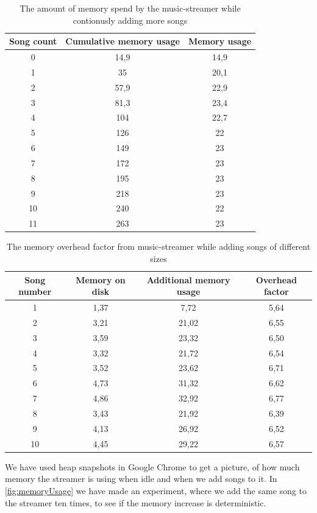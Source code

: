 \begin{table}[]
\centering
\begin{tabular}{|c|c|c|} \hline
Song count & Cumulative memory usage & Memory usage \\ \hline
0  & 14,9 & 14,9 \\
1  & 35   & 20,1 \\
2  & 57,9 & 22,9 \\
3  & 81,3 & 23,4 \\
4  & 104  & 22,7 \\
5  & 126  & 22   \\
6  & 149  & 23   \\
7  & 172  & 23   \\
8  & 195  & 23   \\
9  & 218  & 23   \\
10 & 240  & 22   \\
11 & 263  & 23   \\ \hline
\end{tabular}
\caption{The amount of memory spend by the music-streamer while contionusly adding more songs}
\label{tab_memUsage}
\end{table}

\begin{table}[]
\centering
\begin{tabular}{|c|c|c|c|} \hline
Song number & Memory on disk & Additional memory usage & Overhead factor \\ \hline
1  & 1,37 & 7,72  & 5,64 \\
2  & 3,21 & 21,02 & 6,55 \\
3  & 3,59 & 23,32 & 6,50 \\
4  & 3,32 & 21,72 & 6,54 \\
5  & 3,52 & 23,62 & 6,71 \\
6  & 4,73 & 31,32 & 6,62 \\
7  & 4,86 & 32,92 & 6,77 \\
8  & 3,43 & 21,92 & 6,39 \\
9  & 4,13 & 26,92 & 6,52 \\
10 & 4,45 & 29,22 & 6,57 \\ \hline
\end{tabular}
\caption{The memory overhead factor from music-streamer while adding songs of different sizes}
\label{tab_memUsage}
\end{table}		
\noindent
We have used heap snapshots in Google Chrome to get a picture,
of how much memory the streamer is using when idle and when we add songs to it. 
In \ref{fig:memoryUsage} we have made an experiment,
where we add the same song to the streamer ten times,
to see if the memory increase is deterministic.

